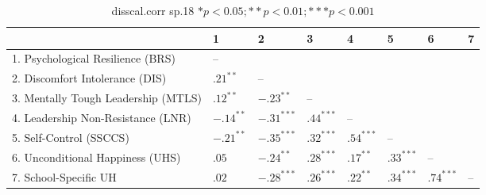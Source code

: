 \begin{table}[ht]
\centering
\begin{tabular}{llllllll}
  \hline
 & 1 & 2 & 3 & 4 & 5 & 6 & 7 \\ 
  \hline
1. Psychological Resilience (BRS) & -- &  &  &  &  &  &  \\ 
  2. Discomfort Intolerance (DIS) & $.21^{**}$ & -- &  &  &  &  &  \\ 
  3. Mentally Tough Leadership (MTLS) & $.12^{**}$ & $-.23^{**}$ & -- &  &  &  &  \\ 
  4. Leadership Non-Resistance (LNR) & $-.14^{**}$ & $-.31^{***}$ & $.44^{***}$ & -- &  &  &  \\ 
  5. Self-Control (SSCCS) & $-.21^{**}$ & $-.35^{***}$ & $.32^{***}$ & $.54^{***}$ & -- &  &  \\ 
  6. Unconditional Happiness (UHS) & $.05$ & $-.24^{**}$ & $.28^{***}$ & $.17^{**}$ & $.33^{***}$ & -- &  \\ 
  7. School-Specific UH & $.02$ & $-.28^{***}$ & $.26^{***}$ & $.22^{**}$ & $.34^{***}$ & $.74^{***}$ & -- \\ 
   \hline
\end{tabular}
\caption{disscal.corr sp.18 $* p < 0.05; ** p < 0.01; *** p < 0.001$} 
\label{freq_corr.disscal.corr.sp.18}
\end{table}
